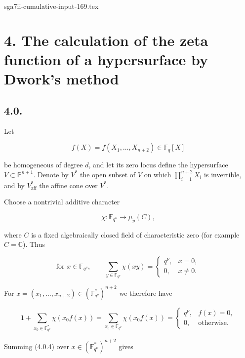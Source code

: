 \begin{filecontents*}{sga7ii-cumulative-input-169.tex}
\section*{4. The calculation of the zeta function of a hypersurface by
Dwork's method}

\subsection*{4.0.}
Let

\begin{equation}\tag{4.0.1}
f(X)=f(X_1,\ldots,X_{n+2})\in\mathbb F_q[X]
\end{equation}

be homogeneous of degree $d$, and let its zero locus define the hypersurface
$V\subset\mathbb P^{n+1}$. Denote by $V^*$ the open subset of $V$ on which
$\prod_{i=1}^{n+2}X_i$ is invertible, and by $V^*_{\mathrm{aff}}$ the affine
cone over $V^*$.

Choose a nontrivial additive character

\begin{equation}\tag{4.0.2}
\chi:\mathbb F_{q^\nu}\longrightarrow\mu_p(C),
\end{equation}

where $C$ is a fixed algebraically closed field of characteristic zero (for
example $C=\mathbb C$). Thus

\begin{equation}\tag{4.0.3}
\text{for }x\in\mathbb F_{q^\nu},\qquad
\sum_{y\in\mathbb F_{q^\nu}}\chi(xy)=
\begin{cases}
q^\nu,&x=0,\\
0,&x\ne0.
\end{cases}
\end{equation}

For $x=(x_1,\ldots,x_{n+2})\in(\mathbb F_{q^\nu}^*)^{n+2}$ we therefore
have

\begin{equation}\tag{4.0.4}
1+\sum_{x_0\in\mathbb F_{q^\nu}^*}\chi(x_0f(x))
=\sum_{x_0\in\mathbb F_{q^\nu}}\chi(x_0f(x))
=
\begin{cases}
q^\nu,&f(x)=0,\\
0,&\text{otherwise}.
\end{cases}
\end{equation}

Summing (4.0.4) over $x\in(\mathbb F_{q^\nu}^*)^{n+2}$ gives


\end{filecontents*}
